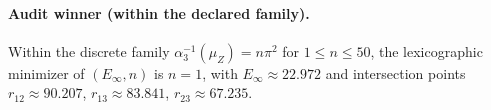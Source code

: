 \paragraph{Audit winner (within the declared family).}
\AuditTag Within the discrete family $\alpha_3^{-1}(\mu_Z)=n\pi^2$ for $1\le n\le 50$, the lexicographic minimizer of $(E_\infty,n)$ is $n=1$, with $E_\infty\approx 22.972$ and intersection points $r_{12}\approx 90.207$, $r_{13}\approx 83.841$, $r_{23}\approx 67.235$.
